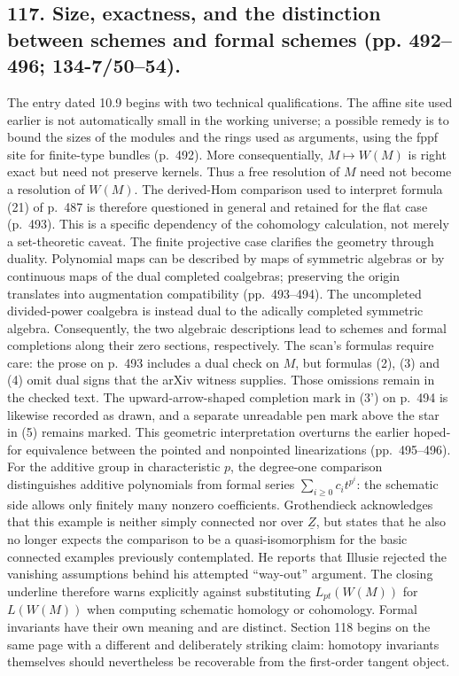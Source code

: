 \documentclass[10pt,oneside]{book}
\begin{document}
\subsection*{117. Size, exactness, and the distinction between schemes and formal schemes (pp. 492--496; 134-7/50--54).}
The entry dated 10.9 begins with two technical qualifications. The affine site used earlier is not automatically small in the working universe; a possible remedy is to bound the sizes of the modules and the rings used as arguments, using the fppf site for finite-type bundles (p.~492). More consequentially, $M\mapsto W(M)$ is right exact but need not preserve kernels. Thus a free resolution of $M$ need not become a resolution of $W(M)$. The derived-Hom comparison used to interpret formula (21) of p.~487 is therefore questioned in general and retained for the flat case (p.~493). This is a specific dependency of the cohomology calculation, not merely a set-theoretic caveat. The finite projective case clarifies the geometry through duality. Polynomial maps can be described by maps of symmetric algebras or by continuous maps of the dual completed coalgebras; preserving the origin translates into augmentation compatibility (pp.~493--494). The uncompleted divided-power coalgebra is instead dual to the adically completed symmetric algebra. Consequently, the two algebraic descriptions lead to schemes and formal completions along their zero sections, respectively. The scan's formulas require care: the prose on p.~493 includes a dual check on $M$, but formulas (2), (3) and (4) omit dual signs that the arXiv witness supplies. Those omissions remain in the checked text. The upward-arrow-shaped completion mark in (3') on p.~494 is likewise recorded as drawn, and a separate unreadable pen mark above the star in (5) remains marked. This geometric interpretation overturns the earlier hoped-for equivalence between the pointed and nonpointed linearizations (pp.~495--496). For the additive group in characteristic $p$, the degree-one comparison distinguishes additive polynomials from formal series $\sum_{i\geq0}c_i t^{p^i}$: the schematic side allows only finitely many nonzero coefficients. Grothendieck acknowledges that this example is neither simply connected nor over $\underline Z$, but states that he also no longer expects the comparison to be a quasi-isomorphism for the basic connected examples previously contemplated. He reports that Illusie rejected the vanishing assumptions behind his attempted ``way-out'' argument. The closing underline therefore warns explicitly against substituting $L_{pt}(W(M))$ for $L(W(M))$ when computing schematic homology or cohomology. Formal invariants have their own meaning and are distinct. Section 118 begins on the same page with a different and deliberately striking claim: homotopy invariants themselves should nevertheless be recoverable from the first-order tangent object.
\end{document}
